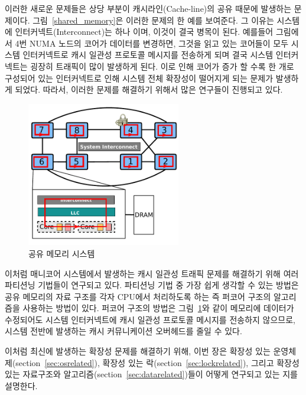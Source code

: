 이러한 새로운 문제들은 상당 부분이 캐시라인(Cache-line)의 공유 때문에 발생하는 문제이다.
그림~\ref{shared_memory}은 이러한 문제의 한 예를 보여준다. 
그 이유는 시스템에 인터커넥트(Interconnect)는 하나 이며, 이것이 결국 병목이 된다. 
예를들어 그림에서 4번 NUMA 노드의 코어가 데이터를 변경하면, 그것을 읽고 있는 코어들이 
모두 시스템 인터커넥트로 캐시 일관성 프로토콜 메시지를 전송하게 되며 결국 시스템 인터커넥트는 
굉장히 트래픽이 많이 발생하게 된다.  
이로 인해 코어가 증가 할 수록 한 개로 구성되어 있는 인터커넥트로 인해 시스템 전체 
확장성이 떨어지게 되는 문제가 발생하게 되었다.
따라서, 이러한 문제를 해결하기 위해서 많은 연구들이 진행되고 있다. 

\begin{figure}[h!]
    \centering
    \includegraphics[width=0.6\textwidth]{fig/archcache_percore}
    \caption{공유 메모리 시스템}
  \label{shared_memory2}
\end{figure}

이처럼 매니코어 시스템에서 발생하는 
캐시 일관성 트래픽 문제를 해결하기 위해 여러 파티션닝 기법들이 연구되고 있다.  
파티션닝 기법 중 가장 쉽게 생각할 수 있는 방법은 공유 메모리의 자료 구조를 각자 
CPU에서 처리하도록 하는 즉 퍼코어 구조의 알고리즘을 사용하는 방법이 있다.
퍼코어 구조의 방법은 그림~\ref{shared_memory2}와 같이 메모리에 데이터가 수정되어도 시스템 
인터커넥트에 캐시 일관성 프로토콜 메시지를 전송하지 않으므로, 
시스템 전반에 발생하는 캐시 커뮤니케이션 오버헤드를 줄일 수 있다. 

이처럼 최신에 발생하는 확장성 문제를 해결하기 위해, 이번 장은 확장성 있는
운영체제(section~\ref{sec:osrelated}), 확장성 있는 락(section~\ref{sec:lockrelated}), 
그리고 확장성 있는 자료구조와 알고리즘(section~\ref{sec:datarelated})들이 어떻게 연구되고 
있는 지를 설명한다.




%



